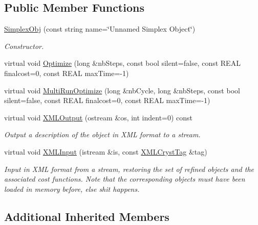 \subsection*{Public Member Functions}
\begin{DoxyCompactItemize}
\item 
\mbox{\label{class_obj_cryst_1_1_simplex_obj_a8af9110ac672b9b932adf838a853b90b}} 
\mbox{\hyperlink{class_obj_cryst_1_1_simplex_obj_a8af9110ac672b9b932adf838a853b90b}{Simplex\+Obj}} (const string name=\char`\"{}Unnamed Simplex Object\char`\"{})
\begin{DoxyCompactList}\small\item\em Constructor. \end{DoxyCompactList}\item 
virtual void \mbox{\hyperlink{class_obj_cryst_1_1_simplex_obj_aa5d987434598f3c6e2045b1446cfb064}{Optimize}} (long \&nb\+Steps, const bool silent=false, const R\+E\+AL finalcost=0, const R\+E\+AL max\+Time=-\/1)
\item 
virtual void \mbox{\hyperlink{class_obj_cryst_1_1_simplex_obj_a15315e9e1509d8c1c0235d4b1e03ed92}{Multi\+Run\+Optimize}} (long \&nb\+Cycle, long \&nb\+Steps, const bool silent=false, const R\+E\+AL finalcost=0, const R\+E\+AL max\+Time=-\/1)
\item 
virtual void \mbox{\hyperlink{class_obj_cryst_1_1_simplex_obj_a6437ce6f4077afb198e26069c4cb224e}{X\+M\+L\+Output}} (ostream \&os, int indent=0) const
\begin{DoxyCompactList}\small\item\em Output a description of the object in X\+ML format to a stream. \end{DoxyCompactList}\item 
virtual void \mbox{\hyperlink{class_obj_cryst_1_1_simplex_obj_aeeb9fa38eb4e321724665045c39ad709}{X\+M\+L\+Input}} (istream \&is, const \mbox{\hyperlink{class_obj_cryst_1_1_x_m_l_cryst_tag}{X\+M\+L\+Cryst\+Tag}} \&tag)
\begin{DoxyCompactList}\small\item\em Input in X\+ML format from a stream, restoring the set of refined objects and the associated cost functions. Note that the corresponding objects must have been loaded in memory before, else shit happens. \end{DoxyCompactList}\end{DoxyCompactItemize}
\subsection*{Additional Inherited Members}


